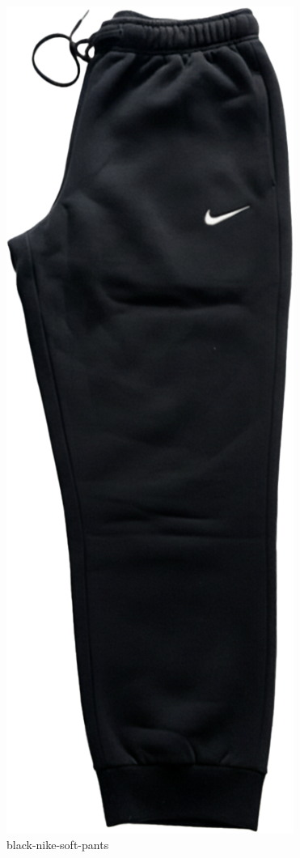 \documentclass[10pt]{article}
\begin{document}
\begin{minipage}[t]{0.22\textwidth}\centering\vspace{0mm}
\includegraphics[width=\linewidth,keepaspectratio]{assets/pants/black-nike-soft-pants.png}\\
\vspace{0.5mm}\tiny black-nike-soft-pants\end{minipage}
\newpage
\end{document}

